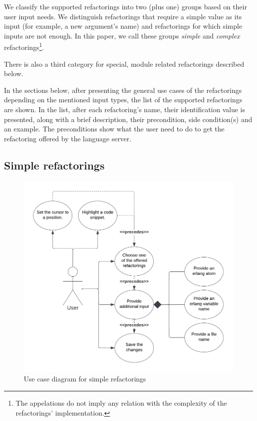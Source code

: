 We classify the supported refactorings into two (plus one) groups based on their user input needs. We distinguish refactorings that require a simple value as its input (for example, a new argument's name) and refactorings for which simple inputs are not enough. In this paper, we call these groups \emph{simple} and \emph{complex} refactorings\footnote{The appelations do not imply any relation with the complexity of the refactorings' implementation.}. 

There is also a third category for special, module related refactorings described below.

In the sections below, after presenting the general use cases of the refactorings depending on the mentioned input types, the list of the supported refactorings are shown. In the list, after each refactoring's name, their identification value is presented, along with a brief description, their precondition, side condition(s) and an example. The preconditions show what the user need to do to get the refactoring offered by the language server.

\subsection{Simple refactorings}

\begin{figure}[H]
	\centering
	\includegraphics[width=1\textwidth]{images/use_case_1.png}
	\caption{Use case diagram for simple refactorings}
	\label{fig:usecase}
\end{figure}

